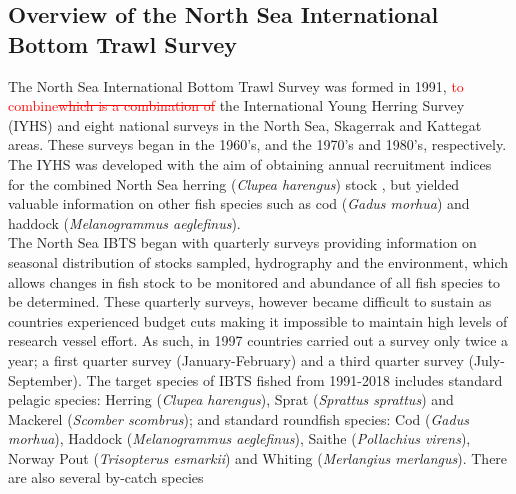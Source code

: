 \documentclass[a4paper 12pt]{article}
\numberwithin{equation}{section}
\newcommand{\ed}[1]{\textcolor{red}{#1}}
\begin{document}
\subsection{Overview of the North Sea International Bottom Trawl Survey}
\label{overview}
\indent The North Sea International Bottom Trawl Survey was formed in 1991, \ed{to combine\sout{which is a combination of}} the International Young Herring Survey (IYHS) and eight national surveys in the North Sea, Skagerrak and Kattegat areas. These surveys began in the 1960's, and the 1970's and 1980's, respectively. The IYHS was developed with the aim of obtaining annual recruitment indices for the combined North Sea herring (\textit{Clupea harengus}) stock \citep{ICES2012}, but yielded valuable information on other fish species such as cod (\textit{Gadus morhua}) and haddock (\textit{Melanogrammus aeglefinus}).\\
\indent The North Sea IBTS began with quarterly surveys providing information on seasonal distribution of stocks sampled, hydrography and the environment, which allows changes in fish stock to be monitored and abundance of all fish species to be determined. These quarterly surveys, however became difficult to sustain as countries experienced budget cuts making it impossible to maintain high levels of research vessel effort. As such, in 1997 countries carried out a survey only twice a year; a first quarter survey (January-February) and a third quarter survey (July-September). The target species of IBTS fished from 1991-2018 includes standard pelagic species: Herring (\textit{Clupea harengus}), Sprat (\textit{Sprattus sprattus}) and Mackerel (\textit{Scomber scombrus}); and standard roundfish species: Cod (\textit{Gadus morhua}), Haddock (\textit{Melanogrammus aeglefinus}), Saithe (\textit{Pollachius virens}),  Norway Pout (\textit{Trisopterus esmarkii})  and Whiting (\textit{Merlangius merlangus}). There are also several by-catch species \citep[see for example,][]{ICES2006}
\end{document}
